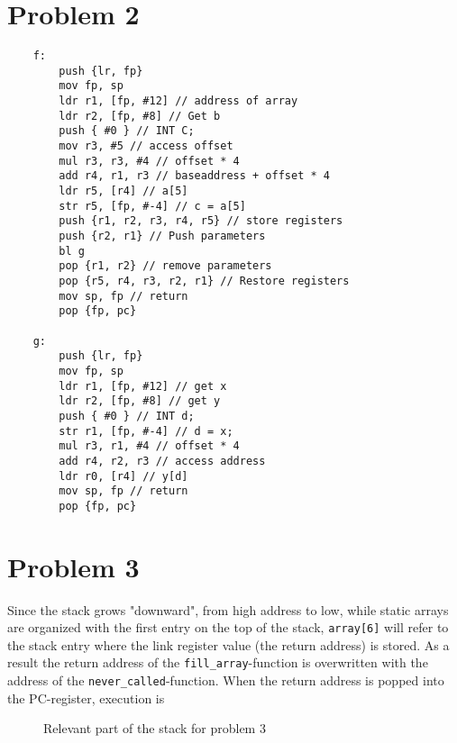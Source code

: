 \documentclass[twoside]{article}
\begin{document}
\begin{multicols}{2}
    \section{Problem 2}

    \begin{verbatim}
    f:
        push {lr, fp}
        mov fp, sp
        ldr r1, [fp, #12] // address of array
        ldr r2, [fp, #8] // Get b
        push { #0 } // INT C;
        mov r3, #5 // access offset
        mul r3, r3, #4 // offset * 4
        add r4, r1, r3 // baseaddress + offset * 4
        ldr r5, [r4] // a[5]
        str r5, [fp, #-4] // c = a[5]
        push {r1, r2, r3, r4, r5} // store registers
        push {r2, r1} // Push parameters
        bl g
        pop {r1, r2} // remove parameters
        pop {r5, r4, r3, r2, r1} // Restore registers
        mov sp, fp // return
        pop {fp, pc}

    g:
        push {lr, fp}
        mov fp, sp
        ldr r1, [fp, #12] // get x
        ldr r2, [fp, #8] // get y
        push { #0 } // INT d;
        str r1, [fp, #-4] // d = x;
        mul r3, r1, #4 // offset * 4
        add r4, r2, r3 // access address
        ldr r0, [r4] // y[d]
        mov sp, fp // return
        pop {fp, pc}
    \end{verbatim}

    \section{Problem 3}

    Since the stack grows "downward", from high address to low, while static arrays are organized with the first entry on the top of the stack, \texttt{array[6]} will refer to the stack entry where the link register value (the return address) is stored.
    As a result the return address of the \texttt{fill\_array}-function is overwritten with the address of the \texttt{never\_called}-function.
    When the return address is popped into the PC-register, execution is 

    \begin{figure}[H]
        \centering
        \caption{Relevant part of the stack for problem 3} \label{fig:prob3stack}
    \end{figure}


\end{multicols}
\end{document}
